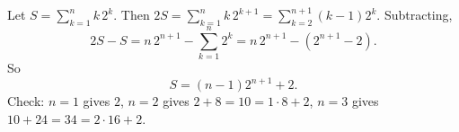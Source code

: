 Let $S=\displaystyle\sum_{k=1}^{n}k\,2^k$. Then $2S=\displaystyle\sum_{k=1}^{n}k\,2^{k+1}=\sum_{k=2}^{n+1}(k-1)2^k$. Subtracting,
\[
2S-S=n\,2^{n+1}-\sum_{k=1}^{n}2^k=n\,2^{n+1}-(2^{n+1}-2).
\]
So
\[
\boxed{S=(n-1)2^{n+1}+2} .
\]
Check: $n=1$ gives $2$, $n=2$ gives $2+8=10=1\cdot8+2$, $n=3$ gives $10+24=34=2\cdot16+2$.
